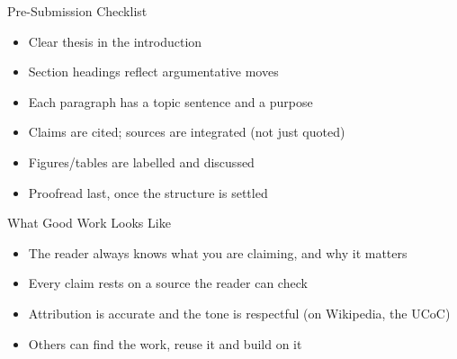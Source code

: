 \documentclass[aspectratio=169]{beamer}
\begin{document}
\begin{frame}{Pre-Submission Checklist}
\begin{itemize}
  \item Clear thesis in the introduction
  \item Section headings reflect argumentative moves
  \item Each paragraph has a topic sentence and a purpose
  \item Claims are cited; sources are integrated (not just quoted)
  \item Figures/tables are labelled and discussed
  \item Proofread last, once the structure is settled
\end{itemize}
\end{frame}

\begin{frame}{What Good Work Looks Like}
\begin{itemize}
  \item The reader always knows what you are claiming, and why it matters
  \item Every claim rests on a source the reader can check
  \item Attribution is accurate and the tone is respectful (on Wikipedia, the UCoC)
  \item Others can find the work, reuse it and build on it
\end{itemize}
\end{frame}
\end{document}

